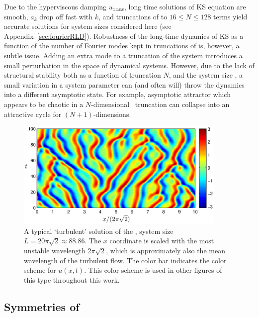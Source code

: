 Due to the hyperviscous damping $u_{xxxx}$, long time solutions of KS
equation are smooth, $a_k$ drop off fast
with $k$, and truncations of  to $16 \leq N \leq 128$
terms yield accurate solutions for system sizes considered here (see
Appendix~\ref{sec:fourierRLD}).  Robustness of the long-time dynamics
of KS as a function of the number of Fourier modes kept in truncations
of  is, however, a subtle issue.  Adding an extra mode to
a truncation of the system introduces a small perturbation in the
space of dynamical systems.  However, due to the lack of structural
stability both as a function of truncation $N$, and the system size
\tildeL, a small variation in a system parameter can (and often will)
throw the dynamics into a different asymptotic state.  For example,
asymptotic attractor which appears to be chaotic in a $N$-dimensional
\statesp\ truncation can collapse into an attractive cycle
for $(N\!+\!1)$-dimensions.

\begin{figure}[t]
\begin{center}
\includegraphics[width=0.9\textwidth]{figs/ks_largeL_cbar.eps}
\end{center}
\caption{
A typical `turbulent' solution of the \KSe, system size
$L=20\pi\sqrt{2}\approx 88.86$.  The $x$ coordinate is scaled
with the most unstable wavelength $2\pi\sqrt{2}$, which is
approximately also the mean wavelength of the turbulent flow.
The color bar indicates the color scheme for $u(x,t)$.  This color
scheme is used in other figures of this type throughout this work.
     } \label{f:ks_largeL}
\end{figure}

\subsection{Symmetries of \KSe}
\label{sec:KSeSymm}

